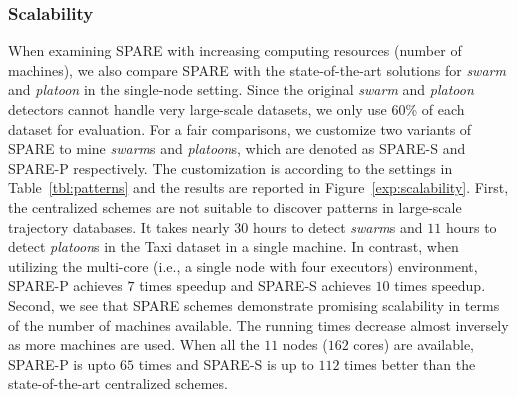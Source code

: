 \subsubsection{Scalability}
When examining SPARE with increasing computing resources (number of machines), we also compare SPARE with the state-of-the-art solutions for \emph{swarm} and \emph{platoon} in the single-node setting. Since the original \emph{swarm} and \emph{platoon} detectors cannot handle very large-scale datasets, we only use 60\% of each dataset for evaluation. For a fair comparisons, we customize two variants of SPARE to mine \emph{swarm}s and \emph{platoon}s, which are denoted as SPARE-S and SPARE-P respectively. The customization is according to the settings in Table~\ref{tbl:patterns} and the results are reported in Figure~\ref{exp:scalability}. 
First, the centralized schemes are not suitable to discover patterns in 
large-scale trajectory databases. It takes nearly $30$ hours to 
detect \emph{swarm}s and $11$ hours to detect \emph{platoon}s in the Taxi dataset in a single machine. 
In contrast, when utilizing the multi-core (i.e., a single node with four executors) environment, 
SPARE-P achieves $7$ times speedup and SPARE-S achieves $10$ times speedup. 
Second, we see that SPARE schemes demonstrate promising scalability in terms of the number of machines available. The running times decrease almost inversely as more machines are used. 
When all the $11$ nodes ($162$ cores) are available, 
SPARE-P is upto $65$ times and SPARE-S is up to $112$ times better than the state-of-the-art centralized schemes.
%
